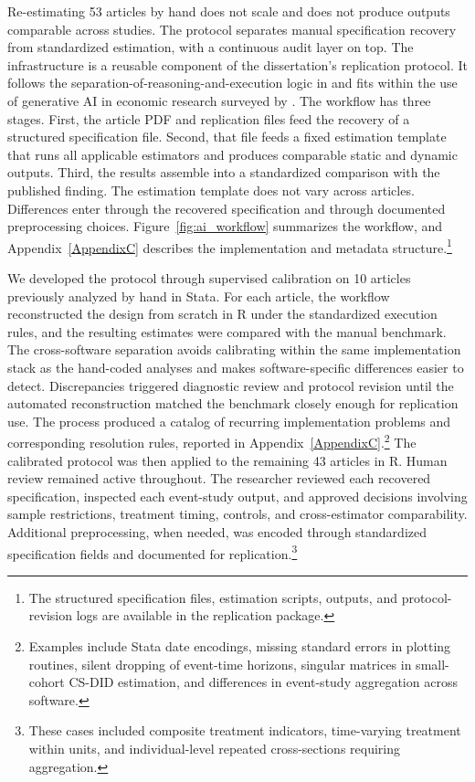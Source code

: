 \documentclass[11pt]{article}
\begin{document}
Re-estimating 53 articles by hand does not scale and does not produce outputs comparable across studies. The protocol separates manual specification recovery from standardized estimation, with a continuous audit layer on top. The infrastructure is a reusable component of the dissertation's replication protocol. It follows the separation-of-reasoning-and-execution logic in \textcite{xu2026scaling} and fits within the use of generative AI in economic research surveyed by \textcite{korinek2023generative}. The workflow has three stages. First, the article PDF and replication files feed the recovery of a structured specification file. Second, that file feeds a fixed estimation template that runs all applicable estimators and produces comparable static and dynamic outputs. Third, the results assemble into a standardized comparison with the published finding. The estimation template does not vary across articles. Differences enter through the recovered specification and through documented preprocessing choices. Figure~\ref{fig:ai_workflow} summarizes the workflow, and Appendix~\ref{AppendixC} describes the implementation and metadata structure.\footnote{The structured specification files, estimation scripts, outputs, and protocol-revision logs are available in the replication package.}


We developed the protocol through supervised calibration on 10 articles previously analyzed by hand in Stata. For each article, the workflow reconstructed the design from scratch in R under the standardized execution rules, and the resulting estimates were compared with the manual benchmark. The cross-software separation avoids calibrating within the same implementation stack as the hand-coded analyses and makes software-specific differences easier to detect. Discrepancies triggered diagnostic review and protocol revision until the automated reconstruction matched the benchmark closely enough for replication use. The process produced a catalog of recurring implementation problems and corresponding resolution rules, reported in Appendix~\ref{AppendixC}.\footnote{Examples include Stata date encodings, missing standard errors in plotting routines, silent dropping of event-time horizons, singular matrices in small-cohort CS-DID estimation, and differences in event-study aggregation across software.} The calibrated protocol was then applied to the remaining 43 articles in R. Human review remained active throughout. The researcher reviewed each recovered specification, inspected each event-study output, and approved decisions involving sample restrictions, treatment timing, controls, and cross-estimator comparability. Additional preprocessing, when needed, was encoded through standardized specification fields and documented for replication.\footnote{These cases included composite treatment indicators, time-varying treatment within units, and individual-level repeated cross-sections requiring aggregation.}
\end{document}

